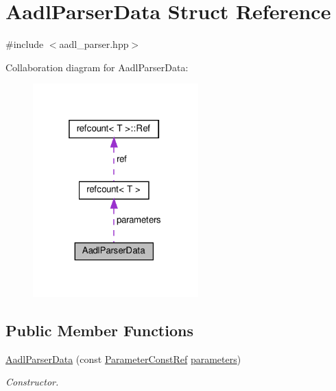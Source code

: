 \hypertarget{structAadlParserData}{}\section{Aadl\+Parser\+Data Struct Reference}
\label{structAadlParserData}


{\ttfamily \#include $<$aadl\+\_\+parser.\+hpp$>$}



Collaboration diagram for Aadl\+Parser\+Data\+:
\nopagebreak
\begin{figure}[H]
\begin{center}
\leavevmode
\includegraphics[width=181pt]{d7/d4a/structAadlParserData__coll__graph}
\end{center}
\end{figure}
\subsection*{Public Member Functions}
\begin{DoxyCompactItemize}
\item 
\hyperlink{structAadlParserData_a38404f654c360ce6e2c6fddfa9fced7e}{Aadl\+Parser\+Data} (const \hyperlink{Parameter_8hpp_a37841774a6fcb479b597fdf8955eb4ea}{Parameter\+Const\+Ref} \hyperlink{structAadlParserData_ad7836437c882428d2580f2e56d6cdc20}{parameters})
\begin{DoxyCompactList}\small\item\em Constructor. \end{DoxyCompactList}\end{DoxyCompactItemize}
